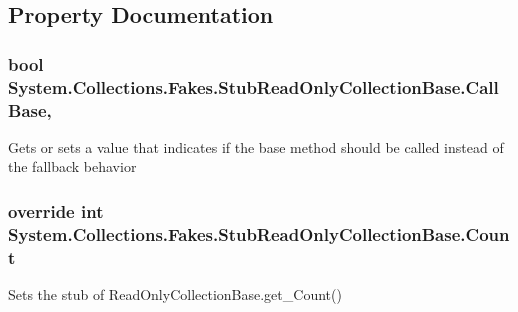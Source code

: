\subsection{Property Documentation}
\hypertarget{class_system_1_1_collections_1_1_fakes_1_1_stub_read_only_collection_base_a8c18cc032129dda04c942f4e38a32b25}{
\subsubsection[{Call\-Base}]{\setlength{\rightskip}{0pt plus 5cm}bool System.\-Collections.\-Fakes.\-Stub\-Read\-Only\-Collection\-Base.\-Call\-Base\hspace{0.3cm}{\ttfamily [get]}, {\ttfamily [set]}}}\label{class_system_1_1_collections_1_1_fakes_1_1_stub_read_only_collection_base_a8c18cc032129dda04c942f4e38a32b25}


Gets or sets a value that indicates if the base method should be called instead of the fallback behavior

\hypertarget{class_system_1_1_collections_1_1_fakes_1_1_stub_read_only_collection_base_af61a3700748e0a65dbe6def4b81cf1e8}{
\subsubsection[{Count}]{\setlength{\rightskip}{0pt plus 5cm}override int System.\-Collections.\-Fakes.\-Stub\-Read\-Only\-Collection\-Base.\-Count\hspace{0.3cm}{\ttfamily [get]}}}\label{class_system_1_1_collections_1_1_fakes_1_1_stub_read_only_collection_base_af61a3700748e0a65dbe6def4b81cf1e8}


Sets the stub of Read\-Only\-Collection\-Base.\-get\-\_\-\-Count()

